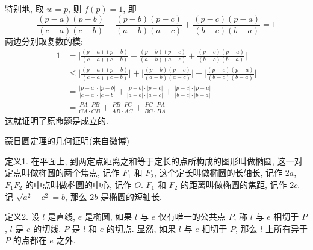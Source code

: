 特别地, 取 $w=p$, 则 $f(p) = 1$, 即
\[\frac{(p-a)(p-b)}{(c-a)(c-b)} + \frac{(p-b)(p-c)}{(a-b)(a-c)} + \frac{(p-c)(p-a)}{(b-c)(b-a)} = 1\]
两边分别取复数的模:
\begin{align*}
1 &=\bigg|\frac{(p-a)(p-b)}{(c-a)(c-b)} + \frac{(p-b)(p-c)}{(a-b)(a-c)} + \frac{(p-c)(p-a)}{(b-c)(b-a)}\bigg|\\
& \le \bigg|\frac{(p-a)(p-b)}{(c-a)(c-b)}\bigg| + \bigg|\frac{(p-b)(p-c)}{(a-b)(a-c)}\bigg| + \bigg|\frac{(p-c)(p-a)}{(b-c)(b-a)}\bigg| \\
&= \frac{|p-a|\cdot |p-b|}{|c-a|\cdot |c-b|} + \frac{|p-b|\cdot |p-c|}{|a-b|\cdot |a-c|} + \frac{|p-c|\cdot |p-a|}{|b-c|\cdot |b-a|}\\
&= \frac{PA\cdot PB}{CA\cdot CB} + \frac{PB\cdot PC}{AB\cdot AC} + \frac{PC\cdot PA}{BC\cdot BA}
\end{align*}
这就证明了原命题是成立的.

\newpage

\noindent 蒙日圆定理的几何证明(来自微博)

定义1. 在平面上, 到两定点距离之和等于定长的点所构成的图形叫做椭圆, 这一对定点叫做椭圆的两个焦点, 记作 $F_1$ 和 $F_2$, 这个定长叫做椭圆的长轴长, 记作 $2a$, $F_1F_2$ 的中点叫做椭圆的中心, 记作 $O$. $F_1$ 和 $F_2$ 的距离叫做椭圆的焦距, 记作 $2c$. 记 $\sqrt{a^2-c^2}=b$, 那么 $2b$ 是椭圆的短轴长.

定义2. 设 $l$ 是直线, $e$ 是椭圆, 如果 $l$ 与 $e$ 仅有唯一的公共点 $P$, 称 $l$ 与 $e$ 相切于 $P$, $l$ 是 $e$ 的切线. $P$ 是 $l$ 和 $e$ 的切点. 显然, 如果 $l$ 与 $e$ 相切于 $P$, 那么 $l$ 上所有异于 $P$ 的点都在 $e$ 之外.
\begin{figure*}[htbp]
\centering
{}
\end{figure*}

